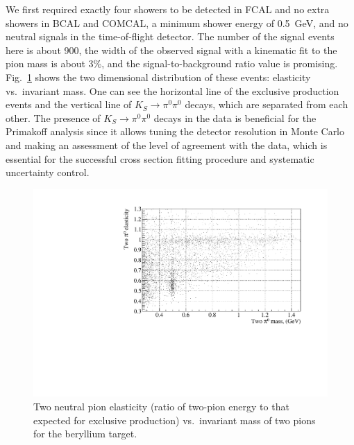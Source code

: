 We first required exactly four showers to be detected in FCAL and no
extra showers in BCAL and COMCAL, a minimum shower energy of
0.5~GeV, and no neutral signals in the time-of-flight detector. The number of the signal
events here is about 900, the width of the observed signal with a
kinematic fit to the pion mass is about 3\%, and the signal-to-background
ratio value is promising. Fig.~\ref{fig:2dbe} shows the two
dimensional distribution of these events: elasticity vs.\ invariant
mass. One can see the horizontal line of the exclusive production
events and the vertical line of $K_S\to\pi^0\pi^0$ decays, which are
separated from each other. The presence of $K_S\to\pi^0\pi^0$ decays
in the data is beneficial for the Primakoff analysis since it
allows tuning the detector resolution in Monte Carlo and making an
assessment of the level of agreement with the data, which
is essential for the successful cross section fitting procedure and
systematic uncertainty control.
\begin{figure}[!h]
\centering\includegraphics[width=4.75in]{figures/2d_be.pdf}
\caption{Two neutral pion elasticity (ratio of two-pion energy to that expected
  for exclusive production) vs.\ invariant mass of two pions
  for the beryllium target.
\label{fig:2dbe}}
\end{figure}

